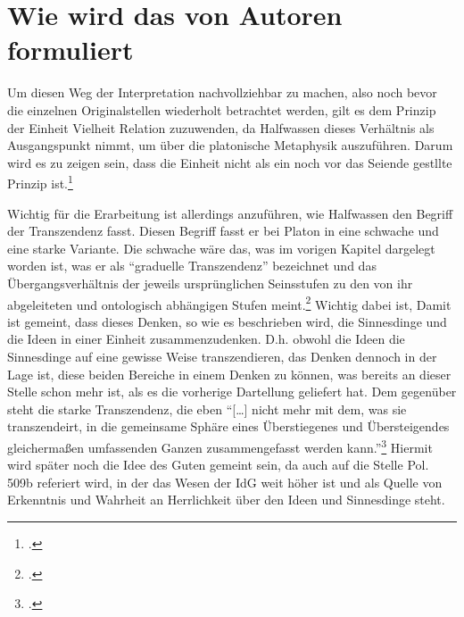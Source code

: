 \section*{Wie wird das von Autoren formuliert}
Um diesen Weg der Interpretation nachvollziehbar zu machen, also noch bevor die einzelnen Originalstellen wiederholt betrachtet werden, gilt es dem Prinzip der Einheit Vielheit Relation zuzuwenden, da Halfwassen dieses Verhältnis als Ausgangspunkt nimmt, um über die platonische Metaphysik auszuführen. Darum wird es zu zeigen sein, dass die Einheit nicht als ein noch vor das Seiende gestllte Prinzip ist.\footcite[vgl.][S.99]{halfwassen2015spuren}

Wichtig für die Erarbeitung ist allerdings anzuführen, wie Halfwassen den Begriff der Transzendenz fasst. Diesen Begriff fasst er bei Platon in eine schwache und eine starke Variante. Die schwache wäre das, was im vorigen Kapitel dargelegt worden ist, was er als \enquote{graduelle Transzendenz} bezeichnet und das Übergangsverhältnis der jeweils ursprünglichen Seinsstufen zu den von ihr abgeleiteten und ontologisch abhängigen Stufen meint.\footcite[vgl.][S. 29]{halfwassen2015spuren} Wichtig dabei ist,  Damit ist gemeint, dass dieses Denken, so wie es beschrieben wird, die Sinnesdinge und die Ideen in einer Einheit zusammenzudenken. D.h. obwohl die Ideen die Sinnesdinge auf eine gewisse Weise transzendieren, das Denken dennoch in der Lage ist, diese beiden Bereiche in einem Denken zu können, was bereits an dieser Stelle schon mehr ist, als es die vorherige Dartellung geliefert hat.
Dem gegenüber steht die starke Transzendenz, die eben \enquote{[\dots] nicht mehr mit dem, was sie transzendeirt, in die gemeinsame Sphäre eines Überstiegenes und Übersteigendes gleichermaßen umfassenden Ganzen zusammengefasst werden kann.}\footcite[vgl.][S. 29]{halfwassen2015spuren} Hiermit wird später noch die Idee des Guten gemeint sein, da auch auf die Stelle Pol. 509b referiert wird, in der das Wesen der IdG weit höher ist und als Quelle von Erkenntnis und Wahrheit an Herrlichkeit über den Ideen und Sinnesdinge steht.

